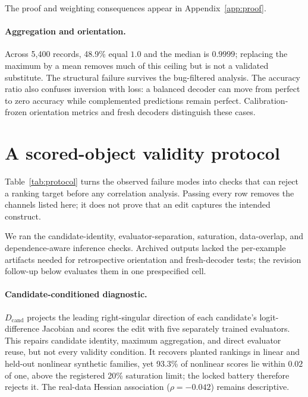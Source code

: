 \documentclass{article}
\newcommand{\Dcand}{D_{\mathrm{cand}}}
\begin{document}
The proof and weighting consequences appear in Appendix~\ref{app:proof}.

\paragraph{Aggregation and orientation.}
Across 5,400 records, 48.9\% equal $1.0$ and the median is $0.9999$; replacing the maximum by a mean removes much of this ceiling but is not a validated substitute. The structural failure survives the bug-filtered analysis. The accuracy ratio also confuses inversion with loss: a balanced decoder can move from perfect to zero accuracy while complemented predictions remain perfect. Calibration-frozen orientation metrics and fresh decoders distinguish these cases.

\section{A scored-object validity protocol}
\label{sec:protocol}

Table~\ref{tab:protocol} turns the observed failure modes into checks that can reject a ranking target before any correlation analysis. Passing every row removes the channels listed here; it does not prove that an edit captures the intended construct.

We ran the candidate-identity, evaluator-separation, saturation, data-overlap, and dependence-aware inference checks. Archived outputs lacked the per-example artifacts needed for retrospective orientation and fresh-decoder tests; the revision follow-up below evaluates them in one prespecified cell.


\paragraph{Candidate-conditioned diagnostic.}
$\Dcand$ projects the leading right-singular direction of each candidate's logit-difference Jacobian and scores the edit with five separately trained evaluators. This repairs candidate identity, maximum aggregation, and direct evaluator reuse, but not every validity condition. It recovers planted rankings in linear and held-out nonlinear synthetic families, yet 93.3\% of nonlinear scores lie within $0.02$ of one, above the registered 20\% saturation limit; the locked battery therefore rejects it. The real-data Hessian association ($\rho=-0.042$) remains descriptive.
\end{document}
